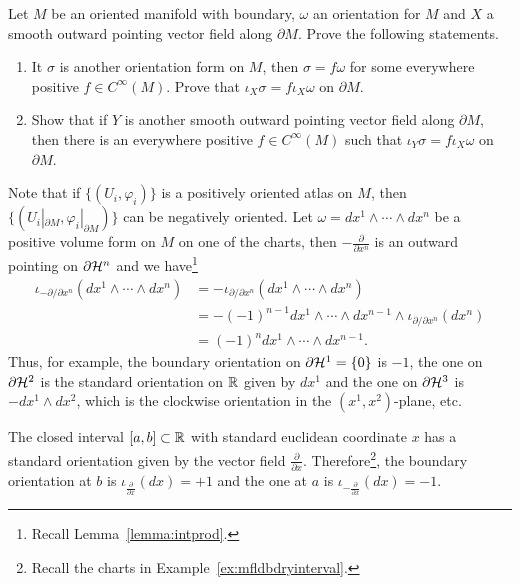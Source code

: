 \begin{exercise}\label{ex:vfshape}
  Let $M$ be an oriented manifold with boundary, $\omega$ an orientation for $M$ and $X$ a smooth outward pointing vector field along $\partial M$.
  Prove the following statements.
  \begin{enumerate}
    \item It $\sigma$ is another orientation form on $M$, then $\sigma = f\omega$ for some everywhere positive $f\in C^\infty(M)$. Prove that  $\iota_X\sigma = f\iota_X \omega$ on $\partial M$.
    \item Show that if $Y$ is another smooth outward pointing vector field along $\partial M$, then there is an everywhere positive $f\in C^\infty(M)$ such that $\iota_Y\sigma = f \iota_X \omega$ on $\partial M$.
  \end{enumerate}
\end{exercise}

Note that if $\{(U_i, \varphi_i)\}$ is a positively oriented atlas on $M$, then $\{(U_i|_{\partial M}, \varphi_i|_{\partial M})\}$ can be negatively oriented. 
Let $\omega = dx^1\wedge\cdots\wedge dx^n$ be a positive volume form on $M$ on one of the charts, then $-\frac{\partial}{\partial x^n}$ is an outward pointing on $\partial \mathcal{H}^n$ and we have\footnote{Recall Lemma~\ref{lemma:intprod}.}
\begin{align}
  \iota_{-{\partial}/\!{\partial x^n}} (dx^1\wedge\cdots\wedge dx^n)
  &= -\iota_{{\partial}/\!{\partial x^n}} (dx^1\wedge\cdots\wedge dx^n) \\
  &= -(-1)^{n-1} dx^1\wedge\cdots\wedge dx^{n-1}\wedge \iota_{{\partial}/\!{\partial x^n}} (dx^n) \\
  &= (-1)^n dx^1\wedge\cdots\wedge dx^{n-1}.
\end{align}
Thus, for example, the boundary orientation on $\partial \mathcal{H}^1 = \{0\}$ is $-1$, the one on $\partial \mathcal{H}^2$ is the standard orientation on $\mathbb{R}$ given by $dx^1$ and the one on $\partial \mathcal{H}^3$ is $-dx^1\wedge dx^2$, which is the clockwise orientation in the $(x^1, x^2)$-plane, etc.

\begin{example}\label{ex:int:bdryo}
  The closed interval $[a,b]\subset\mathbb{R}$ with standard euclidean coordinate $x$ has a standard orientation given by the vector field $\frac{\partial}{\partial x}$. 
  Therefore\footnote{Recall the charts in Example~\ref{ex:mfldbdryinterval}.}, the boundary orientation at $b$ is $\iota_{\frac{\partial}{\partial x}}(dx) = +1$ and the one at $a$ is $\iota_{-\frac{\partial}{\partial x}}(dx) = -1$.
\end{example}

